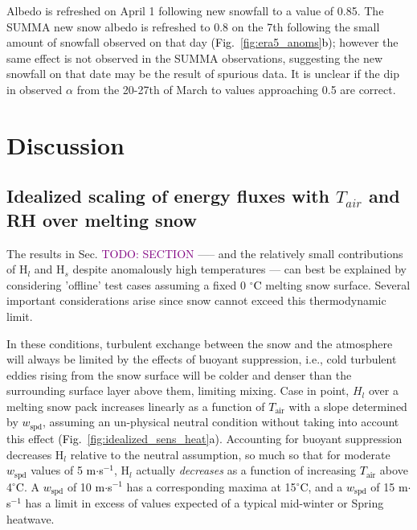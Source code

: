 \documentclass[12pt]{iopjournal}
\newcommand{\fig}[2]{\textcolor{black}{(Fig.~\ref{#1}{#2})}}   %
\newcommand{\comment}[1]{\textcolor{purple}{TODO: #1}}      %
\newcommand{\tair}{\textcolor{black}{$T_{\mathrm{air}}$}\xspace}
\newcommand{\wspd}{\textcolor{black}{$w_{\mathrm{spd}}$}\xspace}
\newcommand{\ms}{\textcolor{black}{m$\cdot$s$^{-1}$}\xspace}
\newcommand{\degrc}{\textcolor{black}{$^\circ$C}\xspace}
\begin{document}
Albedo is refreshed on April 1 following new snowfall to a value of 0.85. 
The SUMMA new snow albedo is refreshed to 0.8 on the 7th following the small amount of snowfall observed on that day \fig{fig:era5_anoms}{b}; however the same effect is not observed in the SUMMA observations, suggesting the new snowfall on that date may be the result of spurious data. 
It is unclear if the dip in observed $\alpha$ from the 20-27th of March to values approaching 0.5 are correct. 




\section{Discussion}

\subsection{Idealized scaling of energy fluxes with $T_{air}$ and RH over melting snow}
The results in Sec. \comment{SECTION} —-- and the relatively small contributions of H$_l$ and H$_s$ despite anomalously high temperatures --- can best be explained by considering 'offline' test cases assuming a fixed 0 \degrc melting snow surface. 
Several important considerations arise since snow cannot exceed this thermodynamic limit.

In these conditions, turbulent exchange between the snow and the atmosphere will always be limited by the effects of buoyant suppression, i.e., cold turbulent eddies rising from the snow surface will be colder and denser than the surrounding surface layer above them, limiting mixing.
Case in point, $H_l$ over a melting snow pack increases linearly as a function of \tair with a slope determined by \wspd, assuming an un-physical neutral condition without taking into account this effect \fig{fig:idealized_sens_heat}{a}.
Accounting for buoyant suppression decreases H$_l$ relative to the neutral assumption, so much so that for moderate \wspd values of 5 \ms, H$_l$ actually \textit{decreases} as a function of increasing \tair above 4\degrc. 
A \wspd of 10 \ms has a corresponding maxima at 15\degrc, and a \wspd of 15 \ms has a limit in excess of values expected of a typical mid-winter or Spring heatwave. 
\end{document}
